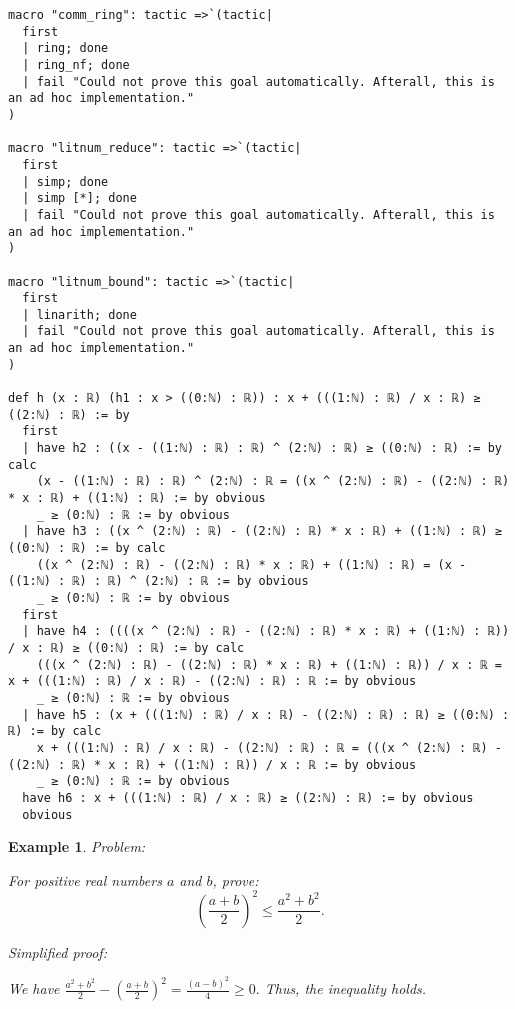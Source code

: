 \documentclass{article}
\newtheorem{example}{Example}
\begin{document}
\begin{tcolorbox}[colback=white!10, width=\linewidth]
\begin{lstlisting}[language=Lean4]
macro "comm_ring": tactic =>`(tactic|
  first
  | ring; done
  | ring_nf; done
  | fail "Could not prove this goal automatically. Afterall, this is an ad hoc implementation."
)

macro "litnum_reduce": tactic =>`(tactic|
  first
  | simp; done
  | simp [*]; done
  | fail "Could not prove this goal automatically. Afterall, this is an ad hoc implementation."
)

macro "litnum_bound": tactic =>`(tactic|
  first
  | linarith; done
  | fail "Could not prove this goal automatically. Afterall, this is an ad hoc implementation."
)

def h (x : ℝ) (h1 : x > ((0:ℕ) : ℝ)) : x + (((1:ℕ) : ℝ) / x : ℝ) ≥ ((2:ℕ) : ℝ) := by
  first
  | have h2 : ((x - ((1:ℕ) : ℝ) : ℝ) ^ (2:ℕ) : ℝ) ≥ ((0:ℕ) : ℝ) := by calc
    (x - ((1:ℕ) : ℝ) : ℝ) ^ (2:ℕ) : ℝ = ((x ^ (2:ℕ) : ℝ) - ((2:ℕ) : ℝ) * x : ℝ) + ((1:ℕ) : ℝ) := by obvious
    _ ≥ (0:ℕ) : ℝ := by obvious
  | have h3 : ((x ^ (2:ℕ) : ℝ) - ((2:ℕ) : ℝ) * x : ℝ) + ((1:ℕ) : ℝ) ≥ ((0:ℕ) : ℝ) := by calc
    ((x ^ (2:ℕ) : ℝ) - ((2:ℕ) : ℝ) * x : ℝ) + ((1:ℕ) : ℝ) = (x - ((1:ℕ) : ℝ) : ℝ) ^ (2:ℕ) : ℝ := by obvious
    _ ≥ (0:ℕ) : ℝ := by obvious
  first
  | have h4 : ((((x ^ (2:ℕ) : ℝ) - ((2:ℕ) : ℝ) * x : ℝ) + ((1:ℕ) : ℝ)) / x : ℝ) ≥ ((0:ℕ) : ℝ) := by calc
    (((x ^ (2:ℕ) : ℝ) - ((2:ℕ) : ℝ) * x : ℝ) + ((1:ℕ) : ℝ)) / x : ℝ = x + (((1:ℕ) : ℝ) / x : ℝ) - ((2:ℕ) : ℝ) : ℝ := by obvious
    _ ≥ (0:ℕ) : ℝ := by obvious
  | have h5 : (x + (((1:ℕ) : ℝ) / x : ℝ) - ((2:ℕ) : ℝ) : ℝ) ≥ ((0:ℕ) : ℝ) := by calc
    x + (((1:ℕ) : ℝ) / x : ℝ) - ((2:ℕ) : ℝ) : ℝ = (((x ^ (2:ℕ) : ℝ) - ((2:ℕ) : ℝ) * x : ℝ) + ((1:ℕ) : ℝ)) / x : ℝ := by obvious
    _ ≥ (0:ℕ) : ℝ := by obvious
  have h6 : x + (((1:ℕ) : ℝ) / x : ℝ) ≥ ((2:ℕ) : ℝ) := by obvious
  obvious

\end{lstlisting}
\end{tcolorbox}


\begin{example}
Problem:
\begin{tcolorbox}[colback=yellow!10, width=\linewidth]
For positive real numbers $a$ and $b$, prove:
    $$\left(\frac{a+b}{2}\right)^2 \leq \frac{a^2+b^2}{2}.$$
\end{tcolorbox}

Simplified proof:
\begin{tcolorbox}[colback=blue!10, width=\linewidth]
We have
$ \frac{a^2+b^2}{2} - \left(\frac{a+b}{2}\right)^2 = \frac{(a-b)^2}{4} \ge 0. $
Thus, the inequality holds.
\end{tcolorbox}
\end{example}
\end{document}
